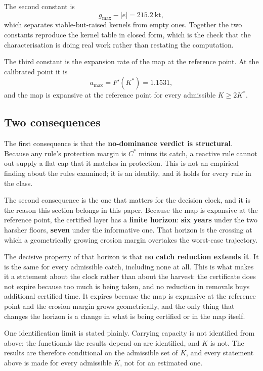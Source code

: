 The second constant is
\[
g_{\max} - |e| = 215.2\ \mathrm{kt},
\]
which separates viable-but-raised kernels from empty ones. Together the two constants
reproduce the kernel table in closed form, which is the check that the characterisation is
doing real work rather than restating the computation.

The third constant is the expansion rate of the map at the reference point. At the
calibrated point it is
\[
a_{\max} = F'(K^{*}) = 1.1531,
\]
and the map is expansive at the reference point for every admissible \(K \ge 2K^{*}\).

\subsection{Two consequences}

The first consequence is that the \textbf{no-dominance verdict is structural}. Because any
rule's protection margin is \(C^{*}\) minus its catch, a reactive rule cannot out-supply a
flat cap that it matches in protection. This is not an empirical finding about the rules
examined; it is an identity, and it holds for every rule in the class.

The second consequence is the one that matters for the decision clock, and it is the
reason this section belongs in this paper. Because the map is expansive at the reference
point, the certified layer has a \textbf{finite horizon}: \textbf{six years} under the two
harsher floors, \textbf{seven} under the informative one. That horizon is the crossing at
which a geometrically growing erosion margin overtakes the worst-case trajectory.

The decisive property of that horizon is that \textbf{no catch reduction extends it}. It is
the same for every admissible catch, including none at all. This is what makes it a
statement about the clock rather than about the harvest: the certificate does not expire
because too much is being taken, and no reduction in removals buys additional certified
time. It expires because the map is expansive at the reference point and the erosion
margin grows geometrically, and the only thing that changes the horizon is a change in
what is being certified or in the map itself.

One identification limit is stated plainly. Carrying capacity is not identified from
above; the functionals the results depend on are identified, and \(K\) is not. The results
are therefore conditional on the admissible set of \(K\), and every statement above is
made for every admissible \(K\), not for an estimated one.

